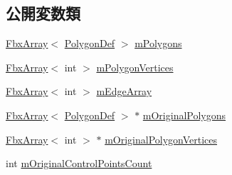 \subsection*{公開変数類}
\begin{DoxyCompactItemize}
\item 
\hyperlink{class_fbx_array}{Fbx\+Array}$<$ \hyperlink{struct_fbx_mesh_1_1_polygon_def}{Polygon\+Def} $>$ \hyperlink{class_fbx_mesh_a61a2707539a87a8637353b6dccbb9782}{m\+Polygons}
\item 
\hyperlink{class_fbx_array}{Fbx\+Array}$<$ int $>$ \hyperlink{class_fbx_mesh_a61068fac65d5a770ebf815fd24772a99}{m\+Polygon\+Vertices}
\item 
\hyperlink{class_fbx_array}{Fbx\+Array}$<$ int $>$ \hyperlink{class_fbx_mesh_a33ccd3fb9c9b146f0bdc2e91fbbb6426}{m\+Edge\+Array}
\item 
\hyperlink{class_fbx_array}{Fbx\+Array}$<$ \hyperlink{struct_fbx_mesh_1_1_polygon_def}{Polygon\+Def} $>$ $\ast$ \hyperlink{class_fbx_mesh_a700722838ae66d0331d6ea718fe27640}{m\+Original\+Polygons}
\item 
\hyperlink{class_fbx_array}{Fbx\+Array}$<$ int $>$ $\ast$ \hyperlink{class_fbx_mesh_aeb42ac5dd106b366aa0f65c98e7d13d2}{m\+Original\+Polygon\+Vertices}
\item 
int \hyperlink{class_fbx_mesh_a2d8025b8f248af85fa7ae99638fb41c4}{m\+Original\+Control\+Points\+Count}
\end{DoxyCompactItemize}
